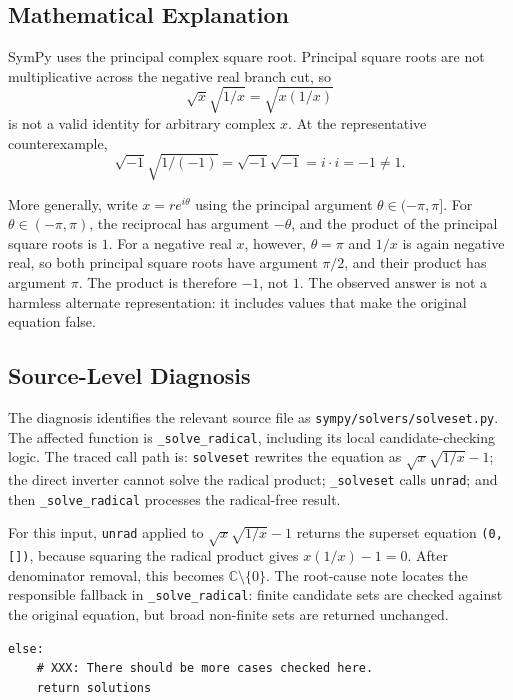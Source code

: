 \documentclass[11pt]{article}
\begin{document}
\subsection{Mathematical Explanation}

SymPy uses the principal complex square root. Principal square roots are not
multiplicative across the negative real branch cut, so
\[
  \sqrt{x}\sqrt{1/x} = \sqrt{x(1/x)}
\]
is not a valid identity for arbitrary complex \(x\). At the representative
counterexample,
\[
  \sqrt{-1}\sqrt{1/(-1)}
    = \sqrt{-1}\sqrt{-1}
    = i\cdot i
    = -1 \ne 1.
\]

More generally, write \(x=r e^{i\theta}\) using the principal argument
\(\theta\in(-\pi,\pi]\). For \(\theta\in(-\pi,\pi)\), the reciprocal has
argument \(-\theta\), and the product of the principal square roots is \(1\).
For a negative real \(x\), however, \(\theta=\pi\) and \(1/x\) is again negative
real, so both principal square roots have argument \(\pi/2\), and their product
has argument \(\pi\). The product is therefore \(-1\), not \(1\). The observed
answer is not a harmless alternate representation: it includes values that make
the original equation false.

\subsection{Source-Level Diagnosis}

The diagnosis identifies the relevant source file as
\nolinkurl{sympy/solvers/solveset.py}. The affected function is
\texttt{\_solve\_radical}, including its local candidate-checking logic. The
traced call path is: \texttt{solveset} rewrites the equation as
\(\sqrt{x}\sqrt{1/x}-1\); the direct inverter cannot solve the radical product;
\texttt{\_solveset} calls \texttt{unrad}; and then
\texttt{\_solve\_radical} processes the radical-free result.

For this input, \texttt{unrad} applied to \(\sqrt{x}\sqrt{1/x}-1\) returns the
superset equation \texttt{(0, [])}, because squaring the radical product gives
\(x(1/x)-1=0\). After denominator removal, this becomes
\(\mathbb{C}\setminus\{0\}\). The root-cause note locates the responsible
fallback in \texttt{\_solve\_radical}: finite candidate sets are checked against
the original equation, but broad non-finite sets are returned unchanged.

\begin{lstlisting}[style=bugpython]
else:
    # XXX: There should be more cases checked here.
    return solutions
\end{lstlisting}
\end{document}
